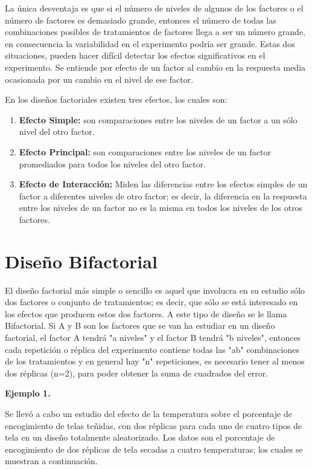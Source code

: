 \documentclass[12pt,letterpaper]{report}
\begin{document}
La única desventaja es que si el número de niveles de algunos de los factores o el número
de factores es demasiado grande, entonces el número de todas las combinaciones posibles de
tratamientos de factores llega a ser un número grande, en consecuencia la variabilidad en el
experimento podría ser grande. Estas dos situaciones, pueden hacer difícil detectar los efectos
significativos en el experimento.
Se entiende por efecto de un factor al cambio en la respuesta media ocasionada por un
cambio en el nivel de ese factor.

En los diseños factoriales existen tres efectos, los cuales son:
\begin{enumerate}
\item \textbf{Efecto Simple:} son comparaciones entre los niveles de un factor a un sólo nivel del otro
factor.
\item \textbf{Efecto Principal:} son comparaciones entre los niveles de un factor promediados para
todos los niveles del otro factor.
\item \textbf{Efecto de Interacción:} Miden las diferencias entre los efectos simples de un factor a
diferentes niveles de otro factor; es decir, la diferencia en la respuesta entre los niveles de
un factor no es la misma en todos los niveles de los otros factores.
\end{enumerate}
\newpage
\section*{Diseño Bifactorial}
El diseño factorial más simple o sencillo es aquel que involucra en su estudio sólo dos
factores o conjunto de tratamientos; es decir, que sólo se está interesado en los efectos que
producen estos dos factores. A este tipo de diseño se le llama Bifactorial.
Si A y B son los factores que se van ha estudiar en un diseño factorial, el factor A tendrá
"a niveles" y el factor B tendrá "b niveles", entonces cada repetición o réplica del experimento
contiene todas las "ab" combinaciones de los tratamientos y en general hay "n" repeticiones, es
necesario tener al menos dos réplicas (n=2), para poder obtener la suma de cuadrados del
error.

\textbf{Ejemplo 1.}

Se llevó a cabo un estudio del efecto de la temperatura sobre el porcentaje de encogimiento de
telas teñidas, con dos réplicas para cada uno de cuatro tipos de tela en un diseño totalmente
aleatorizado. Los datos son el porcentaje de encogimiento de dos réplicas de tela secadas a
cuatro temperaturas; los cuales se muestran a continuación.
\end{document}
